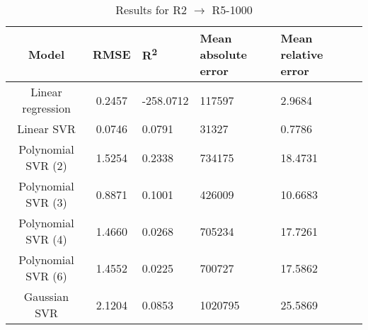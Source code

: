 \begin{table}[H]
\centering
\begin{adjustbox}{center}
\begin{tabular}{c | c M{1.2cm} M{2.5cm} M{2.5cm} M{1.8cm}}
Model & RMSE & R\textsuperscript{2} & Mean absolute error & Mean relative error \tabularnewline
\hline
Linear regression & 0.2457 & -258.0712 & 117597 & 2.9684 \\
Linear SVR & 0.0746 & 0.0791 &  31327 & 0.7786 \\
Polynomial SVR (2) & 1.5254 & 0.2338 & 734175 & 18.4731 \\
Polynomial SVR (3) & 0.8871 & 0.1001 & 426009 & 10.6683 \\
Polynomial SVR (4) & 1.4660 & 0.0268 & 705234 & 17.7261 \\
Polynomial SVR (6) & 1.4552 & 0.0225 & 700727 & 17.5862 \\
Gaussian SVR & 2.1204 & 0.0853 & 1020795 & 25.5869 \\
\end{tabular}
\end{adjustbox}
\\
\caption{Results for R2 $\rightarrow$ R5-1000}
\label{tab:coreonly_linear_R2_R5_1000}
\end{table}
